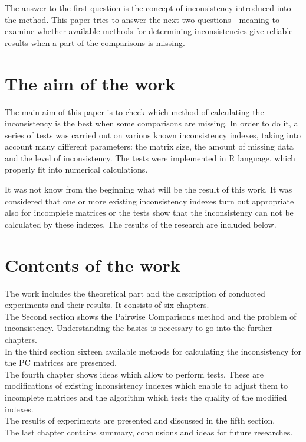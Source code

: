 The answer to the first question is the concept of inconsistency introduced into the method. This paper tries to answer the next two questions - meaning to examine whether available methods for determining inconsistencies give reliable results when a part of the comparisons is missing. 

\section{The aim of the work}
\label{sec:celePracy}
The main aim of this paper is to check which method of calculating the inconsistency is the best when some comparisons are missing. In order to do it, a series of tests was carried out on various known inconsistency indexes, taking into account many different parameters: the matrix size, the amount of missing data and the level of inconsistency.
The tests were implemented in R language, which properly fit into numerical calculations.

It was not know from the beginning what will be the result of this work. It was considered that one or more existing inconsistency indexes turn out appropriate also for incomplete matrices or the tests show that the inconsistency can not be calculated by these indexes. 
The results of the research are included below.

\section{Contents of the work}
\label{sec:zawartoscPracy}
The work includes the theoretical part and the description of conducted experiments and their results. It consists of six chapters.\\
The Second section shows the Pairwise Comparisons method and the problem of inconsistency. Understanding the basics is necessary to go into the further chapters.\\
In the third section sixteen available methods for calculating the inconsistency for the PC matrices are presented. \\
The fourth chapter shows ideas which allow to perform tests. These are modifications of existing inconsistency indexes which enable  to adjust them to incomplete matrices and the algorithm which tests the quality of the modified indexes. \\
The results of experiments are presented and discussed in the fifth section.\\
The last chapter contains summary, conclusions and ideas for future researches.